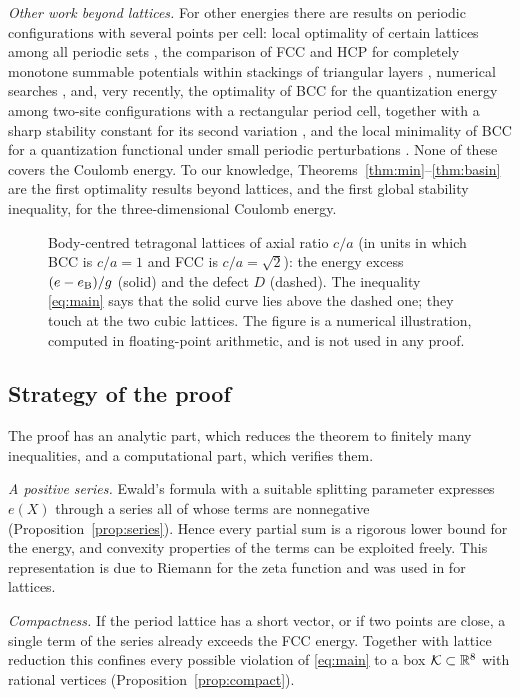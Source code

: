 \emph{Other work beyond lattices.} For other energies there are results on periodic configurations with several points per cell:
local optimality of certain lattices among all periodic sets \cite{CoulangeonSchurmann2012,CoulangeonSchurmann2021}, the comparison of
FCC and HCP for completely monotone summable potentials within stackings of triangular layers \cite{BeterminPetrache2017}, numerical
searches \cite{CohnKumarSchurmann2009}, and, very recently, the optimality of BCC for the quantization energy among two-site
configurations with a rectangular period cell, together with a sharp stability constant for its second variation
\cite{LuoXie2026}, and the local minimality of BCC for a quantization functional under small periodic perturbations
\cite{AydinIacobelli2026}. None of these covers the Coulomb energy. To our knowledge, Theorems~\ref{thm:min}--\ref{thm:basin} are the first
optimality results beyond lattices, and the first global stability inequality, for the three-dimensional Coulomb energy.

\begin{figure}[h]
\centering

\caption{Body-centred tetragonal lattices of axial ratio $c/a$ (in units in which BCC is $c/a=1$ and FCC is $c/a=\sqrt2$): the
energy excess $(e-e_{\mathrm B})/g$ (solid) and the defect $D$ (dashed). The inequality \eqref{eq:main} says that the solid curve lies above
the dashed one; they touch at the two cubic lattices. The figure is a numerical illustration, computed in floating-point
arithmetic, and is not used in any proof.}\label{fig:bain}
\end{figure}

\subsection{Strategy of the proof}

The proof has an analytic part, which reduces the theorem to finitely many inequalities, and a computational part, which verifies
them.

\emph{A positive series.} Ewald's formula with a suitable splitting parameter expresses $e(X)$ through a series all of whose terms
are nonnegative (Proposition~\ref{prop:series}). Hence every partial sum is a rigorous lower bound for the energy, and convexity
properties of the terms can be exploited freely. This representation is due to Riemann for the zeta function and was used in
\cite{SarnakStrombergsson2006,MuratovNovaga2026} for lattices.

\emph{Compactness.} If the period lattice has a short vector, or if two points are close, a single term of the series already exceeds
the FCC energy. Together with lattice reduction this confines every possible violation of \eqref{eq:main} to a box
$\mathcal K\subset\mathbb R^8$ with rational vertices (Proposition~\ref{prop:compact}).

